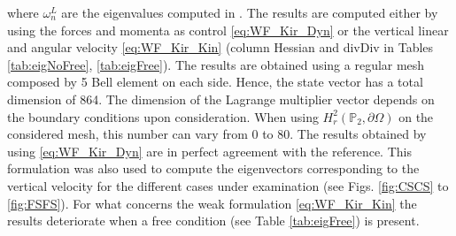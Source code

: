 \documentclass[preprint,12pt]{elsarticle}
\begin{document}
{where $\omega_{n}^{L}$ are the eigenvalues computed in \cite{LeissaRect}. The results are computed either by using the forces and momenta as control \eqref{eq:WF_Kir_Dyn} or the vertical linear and angular velocity \eqref{eq:WF_Kir_Kin} (column Hessian and divDiv in Tables \ref{tab:eigNoFree}, \ref{tab:eigFree}).  The results are obtained using a regular mesh composed by 5 Bell element on each side. Hence, the state vector has a total dimension of 864. The dimension of the Lagrange multiplier vector depends on the boundary conditions upon consideration.  When using $H_r^2(\mathbb{P}_2, \partial\Omega)$ on the considered mesh, this number can vary from 0 to 80. The results obtained by using \eqref{eq:WF_Kir_Dyn} are in perfect agreement with the reference. This formulation was also used to compute the eigenvectors corresponding to the vertical velocity for the different cases under examination (see Figs. \ref{fig:CSCS} to \ref{fig:FSFS}). For what concerns the weak formulation \eqref{eq:WF_Kir_Kin} the results deteriorate when a free condition (see Table \ref{tab:eigFree}) is present. 
}
\end{document}
